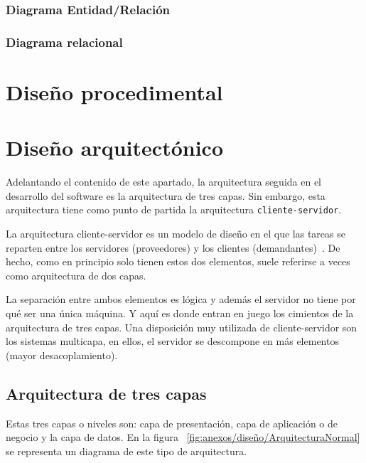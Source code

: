\begin{landscape}
\subsubsection{Diagrama Entidad/Relación}
\end{landscape}

\subsubsection{Diagrama relacional}
\section{Diseño procedimental}


\section{Diseño arquitectónico}

Adelantando el contenido de este apartado, la arquitectura seguida en el
desarrollo del software es la arquitectura de tres capas. Sin embargo, esta
arquitectura tiene como punto de partida la arquitectura
\texttt{cliente-servidor}.

La arquitectura cliente-servidor es un modelo de diseño en el que las tareas se
reparten entre los servidores (proveedores) y los clientes
(demandantes)~\cite{eswiki:149310099}. De hecho, como en principio solo tienen
estos dos elementos, suele referirse a veces como arquitectura de dos capas.

La separación entre ambos elementos es lógica y además el servidor no tiene por
qué ser una única máquina. Y aquí es donde entran en juego los cimientos de la
arquitectura de tres capas. Una disposición muy utilizada de cliente-servidor
son los sistemas multicapa, en ellos, el servidor se descompone en más elementos
(mayor desacoplamiento).

\subsection{Arquitectura de tres capas}

Estas tres capas o niveles son: capa de presentación, capa de aplicación o de
negocio y la capa de datos. En la figura
~\ref{fig:anexos/diseño/ArquitecturaNormal} se representa un diagrama de este
tipo de arquitectura.

